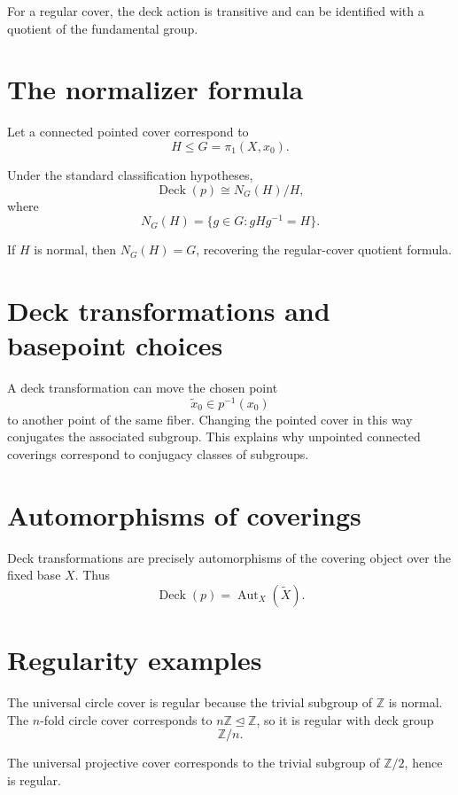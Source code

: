 For a regular cover, the deck action is transitive and can be identified with
a quotient of the fundamental group.

\section{The normalizer formula}

Let a connected pointed cover correspond to
\[
H\le G=\pi_1(X,x_0).
\]

\begin{theorem}
\label{thm:viii12-normalizer}
Under the standard classification hypotheses,
\[
\operatorname{Deck}(p)\cong N_G(H)/H,
\]
where
\[
N_G(H)=\{g\in G:gHg^{-1}=H\}.
\]
\end{theorem}

If \(H\) is normal, then \(N_G(H)=G\), recovering the regular-cover quotient
formula.

\section{Deck transformations and basepoint choices}

A deck transformation can move the chosen point
\[
\tilde x_0\in p^{-1}(x_0)
\]
to another point of the same fiber.  Changing the pointed cover in this way
conjugates the associated subgroup.  This explains why unpointed connected
coverings correspond to conjugacy classes of subgroups.

\section{Automorphisms of coverings}

Deck transformations are precisely automorphisms of the covering object over
the fixed base \(X\).  Thus
\[
\operatorname{Deck}(p)
=
\operatorname{Aut}_X(\widetilde X).
\]

\section{Regularity examples}

The universal circle cover is regular because the trivial subgroup of
\(\mathbb Z\) is normal.  The \(n\)-fold circle cover corresponds to
\(n\mathbb Z\trianglelefteq\mathbb Z\), so it is regular with deck group
\[
\mathbb Z/n.
\]

The universal projective cover corresponds to the trivial subgroup of
\(\mathbb Z/2\), hence is regular.

